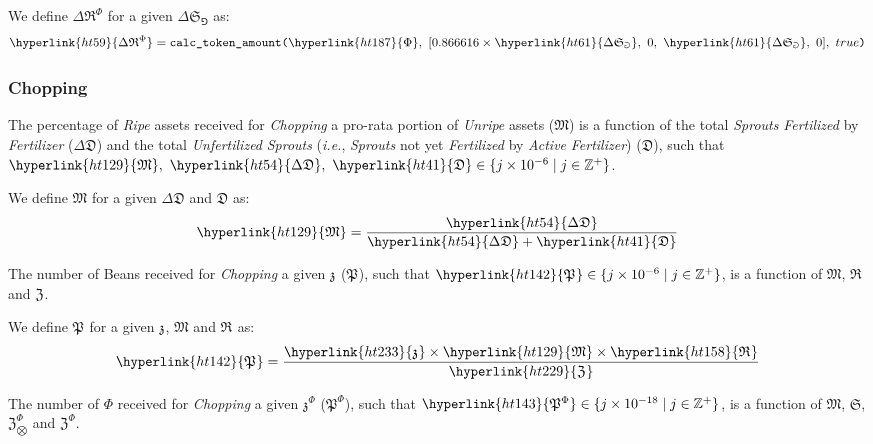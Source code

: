 \documentclass[tikz]{article}
\newcommand{\code}[1]{\texttt{#1}}
\newcommand{\term}[1]{\textsl{#1}}
\newcommand{\bean}{} %
\begin{document}
We define \hyperlink{ht59}{$\Delta \mathfrak{R}^{\Phi}$} for a given \hyperlink{ht61}{$\Delta \mathfrak{S}_{\Game}$} as:
$$\hyperlink{ht59}{\Delta \mathfrak{R}^{\Phi}} = \code{calc\_token\_amount(}\hyperlink{ht187}{\Phi},\ [0.866616 \times \hyperlink{ht61}{\Delta \mathfrak{S}_{\Game}},\ 0,\ \hyperlink{ht61}{\Delta \mathfrak{S}_{\Game}},\ 0],\ true\code{)}$$

\subsubsection{Chopping}
The percentage of \term{Ripe} assets received for \term{Chopping} a pro-rata portion of \term{Unripe} assets (\hyperlink{ht129}{$\mathfrak{M}$}) is a function of the total \term{Sprouts} \term{Fertilized} by \term{Fertilizer} (\hyperlink{ht54}{$\Delta \mathfrak{D}$}) and the total \term{Unfertilized} \term{Sprouts} (\term{i.e.}, \term{Sprouts} not yet \term{Fertilized} by \term{Active} \term{Fertilizer}) (\hyperlink{ht41}{$\mathfrak{D}$}), such that $\hyperlink{ht129}{\mathfrak{M}},\ \hyperlink{ht54}{\Delta \mathfrak{D}},\ \hyperlink{ht41}{\mathfrak{D}} \in \{j \times 10^{-6} \mid j \in \mathbb{Z}^{+} \}$.

We define \hyperlink{ht129}{$\mathfrak{M}$} for a given \hyperlink{ht54}{$\Delta \mathfrak{D}$} and \hyperlink{ht41}{$\mathfrak{D}$} as: 
$$\hyperlink{ht129}{\mathfrak{M}} = \frac{\hyperlink{ht54}{\Delta \mathfrak{D}}}{\hyperlink{ht54}{\Delta \mathfrak{D}} + \hyperlink{ht41}{\mathfrak{D}}} $$

The number of Beans received for \term{Chopping} a given \hyperlink{ht233}{$\mathfrak{z}^{\bean}$} (\hyperlink{ht142}{$\mathfrak{P}^{\bean}$}), such that $\hyperlink{ht142}{\mathfrak{P}^{\bean}} \in \{j \times 10^{-6} \mid j \in \mathbb{Z}^{+} \}$, is a function of \hyperlink{ht129}{$\mathfrak{M}$}, \hyperlink{ht158}{$\mathfrak{R}^{\bean}$} and \hyperlink{ht229}{$\mathfrak{Z}^{\bean}$}.

We define \hyperlink{ht142}{$\mathfrak{P}^{\bean}$} for a given \hyperlink{ht233}{$\mathfrak{z}^{\bean}$}, \hyperlink{ht129}{$\mathfrak{M}$} and \hyperlink{ht158}{$\mathfrak{R}^{\bean}$} as:
$$\hyperlink{ht142}{\mathfrak{P}^{\bean}} = \frac{\hyperlink{ht233}{\mathfrak{z}^{\bean}} \times \hyperlink{ht129}{\mathfrak{M}} \times \hyperlink{ht158}{\mathfrak{R}^{\bean}}}{\hyperlink{ht229}{\mathfrak{Z}^{\bean}}}$$

The number of \hyperlink{ht187}{$\Phi$} received for \term{Chopping} a given \hyperlink{ht235}{$\mathfrak{z}^{\Phi}$} (\hyperlink{ht143}{$\mathfrak{P}^{\Phi}$}), such that $\hyperlink{ht143}{\mathfrak{P}^{\Phi}} \in \{j \times 10^{-18} \mid j \in \mathbb{Z}^{+} \}$, is a function of \hyperlink{ht129}{$\mathfrak{M}$}, \hyperlink{ht174}{$\mathfrak{S}$}, \hyperlink{ht232}{$\mathfrak{Z}_{\bigotimes}^{\Phi}$} and \hyperlink{ht230}{$\mathfrak{Z}^{\Phi}$}.
\end{document}
